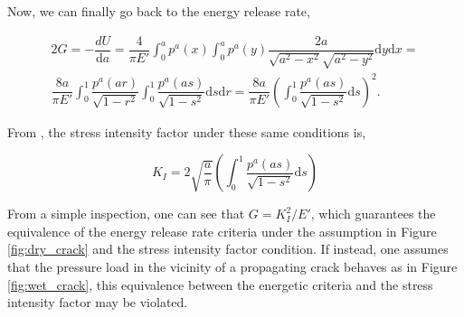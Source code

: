 \noindent Now, we can finally go back to the energy release rate,
    
\begin{multline}
    2G = -\dfrac{dU}{\text{d}a} = \dfrac{4}{\pi E'}\int_{0}^{a} p^{a}(x)\int_0^{a} p^{a}(y)\dfrac{2a}{\sqrt{a^2-x^2}\sqrt{a^2-y^2}} \text{d}y\text{d}x = \\
    \dfrac{8a}{\pi E'}\int_{0}^{1}\dfrac{p^{a}(ar)}{\sqrt{1-r^2}}\int_0^{1} \dfrac{p^{a}(as)}{\sqrt{1-s^2}} \text{d}s\text{d}r
    = \dfrac{8a}{\pi E'}\left( \int_{0}^{1}\dfrac{p^{a}(as)}{\sqrt{1-s^2}}\text{d}s\right)^2.
\end{multline}

\noindent From \cite{bazant2019fracture}, the stress intensity factor under these same conditions is,

\begin{equation}
    K_I = 2\sqrt{\dfrac{a}{\pi}}\left( \int_{0}^{1}\dfrac{p^{a}(as)}{\sqrt{1-s^2}}\text{d}s\right)
\end{equation}

\noindent From a simple inspection, one can see that $G = K_I^2/E'$, which guarantees the equivalence of the energy release rate criteria under the assumption in Figure \ref{fig:dry_crack} and the stress intensity factor condition. If instead, one assumes that the pressure load in the vicinity of a propagating crack behaves as in Figure \ref{fig:wet_crack}, this equivalence between the energetic criteria and the stress intensity factor may be violated.


